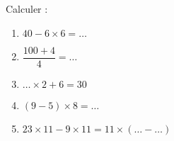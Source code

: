 
\begin{exercice}\label{exosmath-0829}

    Calculer :
    \begin{enumerate}
        \item
            \( 40-6\times 6=\ldots\)
        \item
            \( \dfrac{ 100+4 }{ 4 }=\ldots\)
        \item
            \( \ldots \times 2+6=30\)
        \item
            \( (9-5)\times 8=\ldots\)
        \item
            \( 23\times 11-9\times 11=  11\times (\ldots -\ldots)  \)
    \end{enumerate}

\end{exercice}

